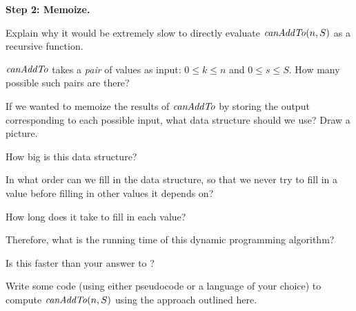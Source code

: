 \documentclass{tufte-handout}
\begin{document}
\pause
\noindent
\textbf{Step 2: Memoize.}

\begin{questions}
  \item Explain why it would be extremely slow to directly evaluate
    $\mathit{canAddTo}(n,S)$ as a recursive function.
  \item $\mathit{canAddTo}$ takes a \emph{pair} of values as input:
    $0 \leq k \leq n$ and $0 \leq s \leq S$.  How many possible such
    pairs are there?
  \item If we wanted to memoize the results of $\mathit{canAddTo}$ by storing
    the output corresponding to each possible input, what data
    structure should we use?  Draw a picture.
  \item How big is this data structure?
  \item In what order can we fill in the data structure, so that we
    never try to fill in a value before filling in other values it
    depends on?
  \item How long does it take to fill in each value?
  \item Therefore, what is the running time of this dynamic
    programming algorithm?
  \item Is this faster than your answer to
    ?
    \newpage
  \item Write some code (using either pseudocode or a language of your
    choice) to compute $\mathit{canAddTo}(n,S)$ using the approach outlined
    here.
\end{questions}
\end{document}
